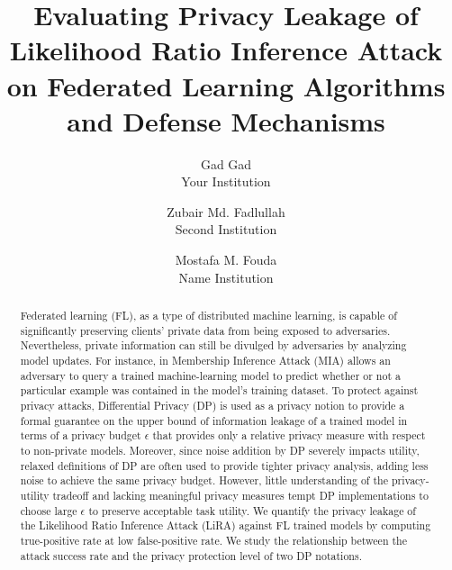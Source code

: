 

\date{}

\title{\Large \bf Evaluating Privacy Leakage of Likelihood Ratio Inference Attack on Federated Learning Algorithms and Defense Mechanisms}

\author{
{\rm Gad Gad}\\
Your Institution
\and
{\rm Zubair Md. Fadlullah}\\
Second Institution
\and
{\rm Mostafa M. Fouda}\\
Name Institution
} %

\maketitle

\begin{abstract}
Federated learning (FL), as a type of distributed machine learning, is capable of significantly preserving clients’ private data from being exposed to adversaries. Nevertheless, private information can still be divulged by adversaries by analyzing model updates. For instance, in Membership Inference Attack (MIA) allows an adversary to query a trained machine-learning model to predict whether or not a particular example was contained in the model’s training dataset. To protect against privacy attacks, Differential Privacy (DP) is used as a privacy notion to provide a formal guarantee on the upper bound of information leakage of a trained model in terms of a privacy budget $\epsilon$ that provides only a relative privacy measure with respect to non-private models. Moreover, since noise addition by DP severely impacts utility, relaxed definitions of DP are often used to provide tighter privacy analysis, adding less noise to achieve the same privacy budget. However, little understanding of the privacy-utility tradeoff and lacking meaningful privacy measures tempt DP implementations to choose large $\epsilon$ to preserve acceptable task utility. We quantify the privacy leakage of the Likelihood Ratio Inference Attack (LiRA) against FL trained models by computing true-positive rate at low false-positive rate. We study the relationship between the attack success rate and the privacy protection level of two DP notations.  
\end{abstract}


